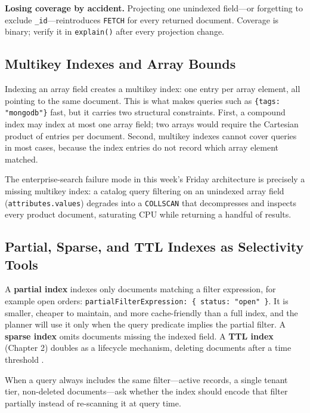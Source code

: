\begin{pitfall}
\textbf{Losing coverage by accident.} Projecting one unindexed field---or forgetting to exclude \texttt{\_id}---reintroduces \texttt{FETCH} for every returned document. Coverage is binary; verify it in \texttt{explain()} after every projection change.
\end{pitfall}

\subsection{Multikey Indexes and Array Bounds}
Indexing an array field creates a multikey index: one entry per array element, all pointing to the same document. This is what makes queries such as \texttt{\{tags: "mongodb"\}} fast, but it carries two structural constraints. First, a compound index may index at most one array field; two arrays would require the Cartesian product of entries per document. Second, multikey indexes cannot cover queries in most cases, because the index entries do not record which array element matched.

The enterprise-search failure mode in this week's Friday architecture is precisely a missing multikey index: a catalog query filtering on an unindexed array field (\texttt{attributes.values}) degrades into a \texttt{COLLSCAN} that decompresses and inspects every product document, saturating CPU while returning a handful of results.

\subsection{Partial, Sparse, and TTL Indexes as Selectivity Tools}
A \textbf{partial index} indexes only documents matching a filter expression, for example open orders: \texttt{partialFilterExpression: \{ status: "open" \}}. It is smaller, cheaper to maintain, and more cache-friendly than a full index, and the planner will use it only when the query predicate implies the partial filter. A \textbf{sparse index} omits documents missing the indexed field. A \textbf{TTL index} (Chapter 2) doubles as a lifecycle mechanism, deleting documents after a time threshold \cite{mongodbTTLDocs}.

\begin{tipbox}
When a query always includes the same filter---active records, a single tenant tier, non-deleted documents---ask whether the index should encode that filter partially instead of re-scanning it at query time.
\end{tipbox}

